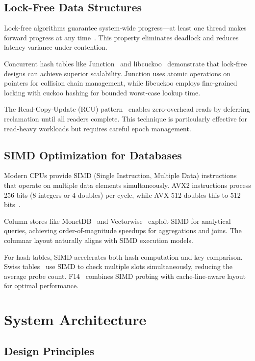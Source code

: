 \documentclass[11pt]{article}
\begin{document}
\subsection{Lock-Free Data Structures}

Lock-free algorithms guarantee system-wide progress—at least one thread makes forward progress at any time~\cite{lock-free-survey}. This property eliminates deadlock and reduces latency variance under contention.

Concurrent hash tables like Junction~\cite{junction} and libcuckoo~\cite{libcuckoo} demonstrate that lock-free designs can achieve superior scalability. Junction uses atomic operations on pointers for collision chain management, while libcuckoo employs fine-grained locking with cuckoo hashing for bounded worst-case lookup time.

The Read-Copy-Update (RCU) pattern~\cite{rcu} enables zero-overhead reads by deferring reclamation until all readers complete. This technique is particularly effective for read-heavy workloads but requires careful epoch management.

\subsection{SIMD Optimization for Databases}

Modern CPUs provide SIMD (Single Instruction, Multiple Data) instructions that operate on multiple data elements simultaneously. AVX2 instructions process 256 bits (8 integers or 4 doubles) per cycle, while AVX-512 doubles this to 512 bits~\cite{simd-databases}.

Column stores like MonetDB~\cite{monetdb} and Vectorwise~\cite{vectorwise} exploit SIMD for analytical queries, achieving order-of-magnitude speedups for aggregations and joins. The columnar layout naturally aligns with SIMD execution models.

For hash tables, SIMD accelerates both hash computation and key comparison. Swiss tables~\cite{swisstables} use SIMD to check multiple slots simultaneously, reducing the average probe count. F14~\cite{f14} combines SIMD probing with cache-line-aware layout for optimal performance.

\section{System Architecture}
\label{sec:architecture}

\subsection{Design Principles}
\end{document}
